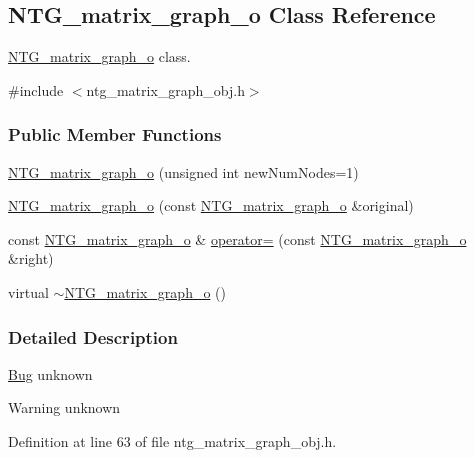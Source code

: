 \subsection{NTG\_\-matrix\_\-graph\_\-o Class Reference}
\label{class_n_t_g__matrix__graph__o}


\hyperlink{class_n_t_g__matrix__graph__o}{NTG\_\-matrix\_\-graph\_\-o} class.  




{\ttfamily \#include $<$ntg\_\-matrix\_\-graph\_\-obj.h$>$}

\subsubsection*{Public Member Functions}
\begin{DoxyCompactItemize}
\item 
\hyperlink{class_n_t_g__matrix__graph__o_a093f28386259017282795531940ea424}{NTG\_\-matrix\_\-graph\_\-o} (unsigned int newNumNodes=1)
\item 
\hyperlink{class_n_t_g__matrix__graph__o_adbf4c7dd34cd7b8db8414599fcd4e2a0}{NTG\_\-matrix\_\-graph\_\-o} (const \hyperlink{class_n_t_g__matrix__graph__o}{NTG\_\-matrix\_\-graph\_\-o} \&original)
\item 
const \hyperlink{class_n_t_g__matrix__graph__o}{NTG\_\-matrix\_\-graph\_\-o} \& \hyperlink{class_n_t_g__matrix__graph__o_a39bfd687d7f0227bf1da4a9bdbcc8d6d}{operator=} (const \hyperlink{class_n_t_g__matrix__graph__o}{NTG\_\-matrix\_\-graph\_\-o} \&right)
\item 
virtual \hyperlink{class_n_t_g__matrix__graph__o_ac8e4cccfe26e04037d02158ab94005c1}{$\sim$NTG\_\-matrix\_\-graph\_\-o} ()
\end{DoxyCompactItemize}


\subsubsection{Detailed Description}
\begin{Desc}
\item[\hyperlink{bug__bug000086}{Bug}]unknown \end{Desc}
\begin{DoxyWarning}{Warning}
unknown 
\end{DoxyWarning}


Definition at line 63 of file ntg\_\-matrix\_\-graph\_\-obj.h.



